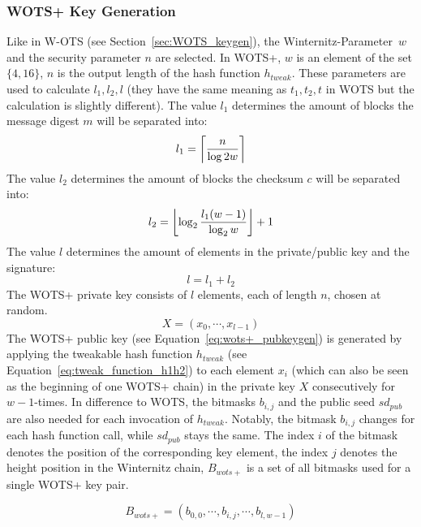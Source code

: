\subsubsection{WOTS+ Key Generation}
\label{sec:wots+_keygen}
Like in W-OTS (see Section~\ref{sec:WOTS_keygen}), the Winternitz-Parameter~$w$ and the security parameter $n$ are selected. In WOTS+, $w$ is an element of the set $\{4, 16\}$, $n$ is the output length of the hash function $h_{tweak}$.
These parameters are used to calculate $l_1, l_2, l$ (they have the same meaning as $t_1, t_2, t$ in WOTS but the calculation is slightly different).
The value $l_1$ determines the amount of blocks the message digest $m$ will be separated into:
\begin{equation}
l_1 = \ceil*{\frac{n}{\log{2}w}}
\end{equation}
The value $l_2$ determines the amount of blocks the checksum $c$ will be separated into: 
\begin{equation}
l_2 = \floor*{\log_{2} \frac{l_1 (w-1)}{\log_{2}w} } +1
\end{equation}
The value $l$ determines the amount of elements in the private/public key and the signature:
\begin{equation}
l = l_1 + l_2
\end{equation}
The WOTS+ private key consists of $l$ elements, each of length $n$, chosen at random.
\begin{equation}
\label{eq:wots+_privkey}
X = (x_0, \cdots, x_{l-1})
\end{equation}
The WOTS+ public key (see Equation~\ref{eq:wots+_pubkeygen}) is generated by applying the tweakable hash function $h_{tweak}$ (see Equation~\ref{eq:tweak_function_h1h2}) to each element $x_i$ (which can also be seen as the beginning of one WOTS+ chain) in the private key $X$ consecutively for $w-1$-times. In difference to WOTS, the bitmasks $b_{i,j}$ and the public seed $sd_{pub}$ are also needed for each invocation of $h_{tweak}$. Notably, the bitmask $b_{i,j}$ changes for each hash function call, while $sd_{pub}$ stays the same. The index $i$ of the bitmask denotes the position of the corresponding key element, the index $j$ denotes the height position in the Winternitz chain, $B_{wots+}$ is a set of all bitmasks used for a single WOTS+ key pair.

\begin{equation}
\label{eq:wots+_all_bitmasks}
B_{wots+} = (b_{0,0}, \cdots, b_{i,j}, \cdots, b_{l,w-1})
\end{equation}

